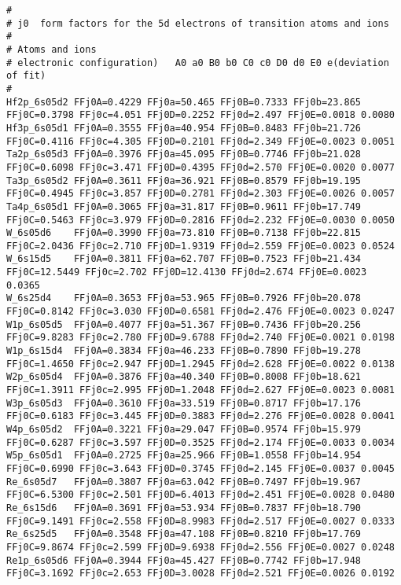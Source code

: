 {\scriptsize
\begin{verbatim}
#
# j0  form factors for the 5d electrons of transition atoms and ions  
#
# Atoms and ions
#￼electronic configuration)   A0 a0 B0 b0 C0 c0 D0 d0 E0 e(deviation of fit)
#
Hf2p_6s05d2 FFj0A=0.4229 FFj0a=50.465 FFj0B=0.7333 FFj0b=23.865 FFj0C=0.3798 FFj0c=4.051 FFj0D=0.2252 FFj0d=2.497 FFj0E=0.0018 0.0080
Hf3p_6s05d1 FFj0A=0.3555 FFj0a=40.954 FFj0B=0.8483 FFj0b=21.726 FFj0C=0.4116 FFj0c=4.305 FFj0D=0.2101 FFj0d=2.349 FFj0E=0.0023 0.0051
Ta2p_6s05d3 FFj0A=0.3976 FFj0a=45.095 FFj0B=0.7746 FFj0b=21.028 FFj0C=0.6098 FFj0c=3.471 FFj0D=0.4395 FFj0d=2.570 FFj0E=0.0020 0.0077
Ta3p_6s05d2 FFj0A=0.3611 FFj0a=36.921 FFj0B=0.8579 FFj0b=19.195 FFj0C=0.4945 FFj0c=3.857 FFj0D=0.2781 FFj0d=2.303 FFj0E=0.0026 0.0057
Ta4p_6s05d1 FFj0A=0.3065 FFj0a=31.817 FFj0B=0.9611 FFj0b=17.749 FFj0C=0.5463 FFj0c=3.979 FFj0D=0.2816 FFj0d=2.232 FFj0E=0.0030 0.0050
W_6s05d6    FFj0A=0.3990 FFj0a=73.810 FFj0B=0.7138 FFj0b=22.815 FFj0C=2.0436 FFj0c=2.710 FFj0D=1.9319 FFj0d=2.559 FFj0E=0.0023 0.0524
W_6s15d5    FFj0A=0.3811 FFj0a=62.707 FFj0B=0.7523 FFj0b=21.434 FFj0C=12.5449 FFj0c=2.702 FFj0D=12.4130 FFj0d=2.674 FFj0E=0.0023 0.0365
W_6s25d4    FFj0A=0.3653 FFj0a=53.965 FFj0B=0.7926 FFj0b=20.078 FFj0C=0.8142 FFj0c=3.030 FFj0D=0.6581 FFj0d=2.476 FFj0E=0.0023 0.0247
W1p_6s05d5  FFj0A=0.4077 FFj0a=51.367 FFj0B=0.7436 FFj0b=20.256 FFj0C=9.8283 FFj0c=2.780 FFj0D=9.6788 FFj0d=2.740 FFj0E=0.0021 0.0198
W1p_6s15d4  FFj0A=0.3834 FFj0a=46.233 FFj0B=0.7890 FFj0b=19.278 FFj0C=1.4650 FFj0c=2.947 FFj0D=1.2945 FFj0d=2.628 FFj0E=0.0022 0.0138
W2p_6s05d4  FFj0A=0.3876 FFj0a=40.340 FFj0B=0.8008 FFj0b=18.621 FFj0C=1.3911 FFj0c=2.995 FFj0D=1.2048 FFj0d=2.627 FFj0E=0.0023 0.0081
W3p_6s05d3  FFj0A=0.3610 FFj0a=33.519 FFj0B=0.8717 FFj0b=17.176 FFj0C=0.6183 FFj0c=3.445 FFj0D=0.3883 FFj0d=2.276 FFj0E=0.0028 0.0041
W4p_6s05d2  FFj0A=0.3221 FFj0a=29.047 FFj0B=0.9574 FFj0b=15.979 FFj0C=0.6287 FFj0c=3.597 FFj0D=0.3525 FFj0d=2.174 FFj0E=0.0033 0.0034
W5p_6s05d1  FFj0A=0.2725 FFj0a=25.966 FFj0B=1.0558 FFj0b=14.954 FFj0C=0.6990 FFj0c=3.643 FFj0D=0.3745 FFj0d=2.145 FFj0E=0.0037 0.0045
Re_6s05d7   FFj0A=0.3807 FFj0a=63.042 FFj0B=0.7497 FFj0b=19.967 FFj0C=6.5300 FFj0c=2.501 FFj0D=6.4013 FFj0d=2.451 FFj0E=0.0028 0.0480
Re_6s15d6   FFj0A=0.3691 FFj0a=53.934 FFj0B=0.7837 FFj0b=18.790 FFj0C=9.1491 FFj0c=2.558 FFj0D=8.9983 FFj0d=2.517 FFj0E=0.0027 0.0333
Re_6s25d5   FFj0A=0.3548 FFj0a=47.108 FFj0B=0.8210 FFj0b=17.769 FFj0C=9.8674 FFj0c=2.599 FFj0D=9.6938 FFj0d=2.556 FFj0E=0.0027 0.0248
Re1p_6s05d6 FFj0A=0.3944 FFj0a=45.427 FFj0B=0.7742 FFj0b=17.948 FFj0C=3.1692 FFj0c=2.653 FFj0D=3.0028 FFj0d=2.521 FFj0E=0.0026 0.0192

\end{verbatim}}
